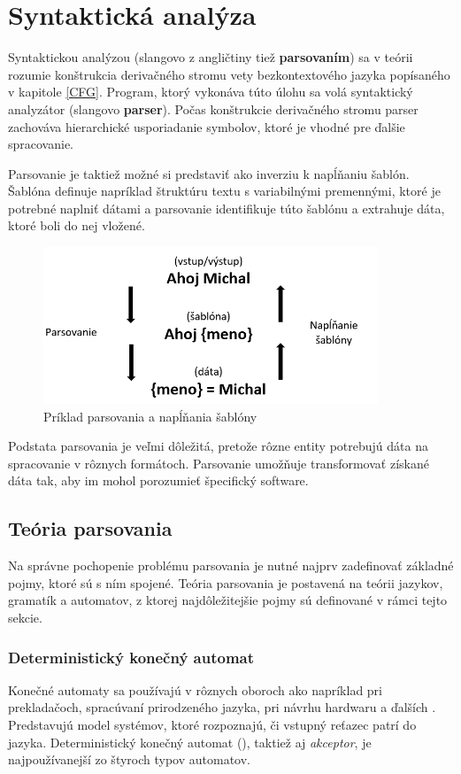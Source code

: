 \chapter{Syntaktická analýza}
Syntaktickou analýzou (slangovo z angličtiny tiež \textbf{parsovaním}) sa v teórii rozumie konštrukcia derivačného stromu vety bezkontextového jazyka\cite{CVUT:program_language} popísaného v kapitole \ref{CFG}. Program, ktorý vykonáva túto úlohu sa volá syntaktický analyzátor (slangovo \textbf{parser}). Počas konštrukcie derivačného stromu parser zachováva hierarchické usporiadanie symbolov, ktoré je vhodné pre ďalšie spracovanie.

Parsovanie je taktiež možné si predstaviť ako inverziu k napĺňaniu šablón. Šablóna definuje napríklad štruktúru textu s variabilnými premennými, ktoré je potrebné naplniť dátami a parsovanie identifikuje túto šablónu a extrahuje dáta, ktoré boli do nej vložené.

\begin{figure}[H]
\begin{center}
\includegraphics[width=10cm]{figures/templatingAndParsing.PNG}
\caption{Príklad parsovania a napĺňania šablóny}
\label{fig:templatingAndParsing}
\end{center}
\end{figure}

Podstata parsovania je veľmi dôležitá, pretože rôzne entity potrebujú dáta na spracovanie v rôznych formátoch. Parsovanie umožňuje transformovať získané dáta tak, aby im mohol porozumieť špecifický software. 

\section{Teória parsovania}
Na správne pochopenie problému parsovania je nutné najprv zadefinovať základné pojmy, ktoré sú s ním spojené. Teória parsovania je postavená na teórii jazykov, gramatík a automatov, z ktorej najdôležitejšie pojmy sú definované v rámci tejto sekcie.

\subsection{Deterministický konečný automat}\label{DFA}
Konečné automaty sa používajú v rôznych oboroch ako napríklad pri prekladačoch, spracúvaní prirodzeného jazyka, pri návrhu hardwaru a ďalších \cite{demlova:automaty}. Predstavujú model systémov, ktoré rozpoznajú, či vstupný reťazec patrí do jazyka. Deterministický konečný automat (), taktiež aj \textit{akceptor}, je najpoužívanejší zo štyroch typov automatov.

